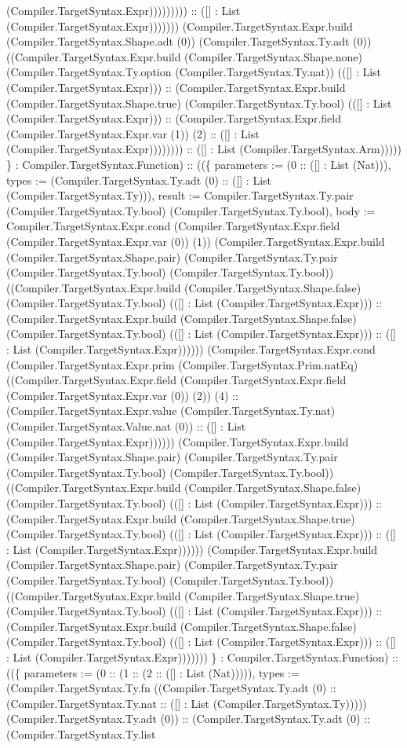 \documentclass[11pt]{article}
\begin{document}
(Compiler.TargetSyntax.Expr))))))))) :: ([] : List (Compiler.TargetSyntax.Expr))))))) (Compiler.TargetSyntax.Expr.build (Compiler.TargetSyntax.Shape.adt (0)) (Compiler.TargetSyntax.Ty.adt (0)) ((Compiler.TargetSyntax.Expr.build (Compiler.TargetSyntax.Shape.none) (Compiler.TargetSyntax.Ty.option (Compiler.TargetSyntax.Ty.nat)) (([] : List (Compiler.TargetSyntax.Expr))) :: (Compiler.TargetSyntax.Expr.build (Compiler.TargetSyntax.Shape.true) (Compiler.TargetSyntax.Ty.bool) (([] : List (Compiler.TargetSyntax.Expr))) :: (Compiler.TargetSyntax.Expr.field (Compiler.TargetSyntax.Expr.var (1)) (2) :: ([] : List (Compiler.TargetSyntax.Expr)))))))) :: ([] : List (Compiler.TargetSyntax.Arm))))) \} : Compiler.TargetSyntax.Function) :: ((\{ parameters := (0 :: ([] : List (Nat))), types := (Compiler.TargetSyntax.Ty.adt (0) :: ([] : List (Compiler.TargetSyntax.Ty))), result := Compiler.TargetSyntax.Ty.pair (Compiler.TargetSyntax.Ty.bool) (Compiler.TargetSyntax.Ty.bool), body := Compiler.TargetSyntax.Expr.cond (Compiler.TargetSyntax.Expr.field (Compiler.TargetSyntax.Expr.var (0)) (1)) (Compiler.TargetSyntax.Expr.build (Compiler.TargetSyntax.Shape.pair) (Compiler.TargetSyntax.Ty.pair (Compiler.TargetSyntax.Ty.bool) (Compiler.TargetSyntax.Ty.bool)) ((Compiler.TargetSyntax.Expr.build (Compiler.TargetSyntax.Shape.false) (Compiler.TargetSyntax.Ty.bool) (([] : List (Compiler.TargetSyntax.Expr))) :: (Compiler.TargetSyntax.Expr.build (Compiler.TargetSyntax.Shape.false) (Compiler.TargetSyntax.Ty.bool) (([] : List (Compiler.TargetSyntax.Expr))) :: ([] : List (Compiler.TargetSyntax.Expr)))))) (Compiler.TargetSyntax.Expr.cond (Compiler.TargetSyntax.Expr.prim (Compiler.TargetSyntax.Prim.natEq) ((Compiler.TargetSyntax.Expr.field (Compiler.TargetSyntax.Expr.field (Compiler.TargetSyntax.Expr.var (0)) (2)) (4) :: (Compiler.TargetSyntax.Expr.value (Compiler.TargetSyntax.Ty.nat) (Compiler.TargetSyntax.Value.nat (0)) :: ([] : List (Compiler.TargetSyntax.Expr)))))) (Compiler.TargetSyntax.Expr.build (Compiler.TargetSyntax.Shape.pair) (Compiler.TargetSyntax.Ty.pair (Compiler.TargetSyntax.Ty.bool) (Compiler.TargetSyntax.Ty.bool)) ((Compiler.TargetSyntax.Expr.build (Compiler.TargetSyntax.Shape.false) (Compiler.TargetSyntax.Ty.bool) (([] : List (Compiler.TargetSyntax.Expr))) :: (Compiler.TargetSyntax.Expr.build (Compiler.TargetSyntax.Shape.true) (Compiler.TargetSyntax.Ty.bool) (([] : List (Compiler.TargetSyntax.Expr))) :: ([] : List (Compiler.TargetSyntax.Expr)))))) (Compiler.TargetSyntax.Expr.build (Compiler.TargetSyntax.Shape.pair) (Compiler.TargetSyntax.Ty.pair (Compiler.TargetSyntax.Ty.bool) (Compiler.TargetSyntax.Ty.bool)) ((Compiler.TargetSyntax.Expr.build (Compiler.TargetSyntax.Shape.true) (Compiler.TargetSyntax.Ty.bool) (([] : List (Compiler.TargetSyntax.Expr))) :: (Compiler.TargetSyntax.Expr.build (Compiler.TargetSyntax.Shape.false) (Compiler.TargetSyntax.Ty.bool) (([] : List (Compiler.TargetSyntax.Expr))) :: ([] : List (Compiler.TargetSyntax.Expr))))))) \} : Compiler.TargetSyntax.Function) :: ((\{ parameters := (0 :: (1 :: (2 :: ([] : List (Nat))))), types := (Compiler.TargetSyntax.Ty.fn ((Compiler.TargetSyntax.Ty.adt (0) :: (Compiler.TargetSyntax.Ty.nat :: ([] : List (Compiler.TargetSyntax.Ty))))) (Compiler.TargetSyntax.Ty.adt (0)) :: (Compiler.TargetSyntax.Ty.adt (0) :: (Compiler.TargetSyntax.Ty.list 
\end{document}
